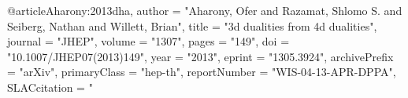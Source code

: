 @article{Aharony:2013dha,
      author         = "Aharony, Ofer and Razamat, Shlomo S. and Seiberg, Nathan
                        and Willett, Brian",
      title          = "{3d dualities from 4d dualities}",
      journal        = "JHEP",
      volume         = "1307",
      pages          = "149",
      doi            = "10.1007/JHEP07(2013)149",
      year           = "2013",
      eprint         = "1305.3924",
      archivePrefix  = "arXiv",
      primaryClass   = "hep-th",
      reportNumber   = "WIS-04-13-APR-DPPA",
      SLACcitation   = "%
}